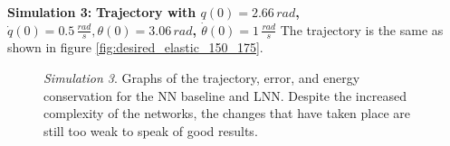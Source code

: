 \documentclass[a4paper]{article}
\begin{document}
\textbf{Simulation 3:} \textbf{Trajectory with $q(0)=2.66\, rad$, $\dot{q}(0)=0.5\, \frac{rad}{s}, \theta(0)=3.06\, rad$, $\dot{\theta}(0)=1\, \frac{rad}{s}$}
The trajectory is the same as shown in figure \ref{fig:desired_elastic_150_175}.

\begin{figure}
    \centering
    \qquad
    \caption{\textit{Simulation 3}. Graphs of the trajectory, error, and energy conservation for the NN baseline and LNN. Despite the increased complexity of the networks, the changes that have taken place are still too weak to speak of good results.}
    \label{fig:elastic_500_150_175}
\end{figure}
\end{document}
